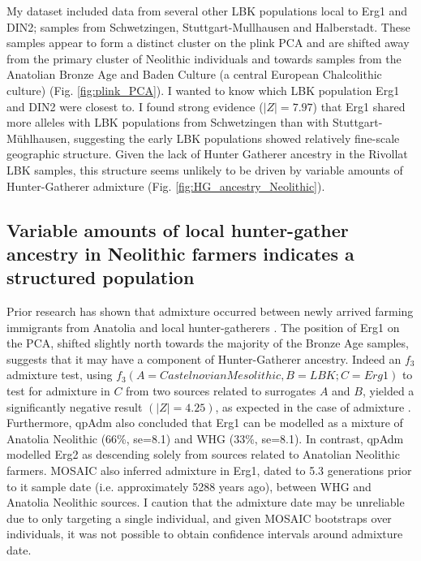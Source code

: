 My dataset included data from several other LBK populations local to Erg1 and DIN2; samples from Schwetzingen, Stuttgart-Mullhausen and Halberstadt. These samples appear to form a distinct cluster on the plink PCA and are shifted away from the primary cluster of Neolithic individuals and towards samples from the Anatolian Bronze Age and Baden Culture (a central European Chalcolithic culture) (Fig. \ref{fig:plink_PCA}). I wanted to know which LBK population Erg1 and DIN2 were closest to. I found strong evidence ($|Z| = 7.97$) that Erg1 shared more alleles with LBK populations from Schwetzingen than with Stuttgart-Mühlhausen, suggesting the early LBK populations showed relatively fine-scale geographic structure. Given the lack of Hunter Gatherer ancestry in the Rivollat LBK samples, this structure seems unlikely to be driven by variable amounts of Hunter-Gatherer admixture (Fig. \ref{fig:HG_ancestry_Neolithic}).


\subsection{Variable amounts of local hunter-gather ancestry in Neolithic farmers indicates a structured population}

Prior research has shown that admixture occurred between newly arrived farming immigrants from Anatolia and local hunter-gatherers \cite{Gamba2014, Haak2015, mathieson2018genomic, gonzalez2017paleogenomic, Lipson2017b}. The position of Erg1 on the PCA, shifted slightly north towards the majority of the Bronze Age samples, suggests that it may have a component of Hunter-Gatherer ancestry. Indeed an $f_{3}$ admixture test, using $f_{3}(A=Castelnovian Mesolithic, B=LBK; C=Erg1)$ to test for admixture in $C$ from two sources related to surrogates $A$ and $B$, yielded a significantly negative result $(|Z|=4.25)$, as expected in the case of admixture \cite{Patterson2012}. Furthermore, qpAdm also concluded that Erg1 can be modelled as a mixture of Anatolia Neolithic (66\%, se=8.1) and WHG (33\%, se=8.1). In contrast, qpAdm modelled Erg2 as descending solely from sources related to Anatolian Neolithic farmers. MOSAIC also inferred admixture in Erg1, dated to 5.3 generations prior to it sample date (i.e. approximately 5288 years ago), between WHG and Anatolia Neolithic sources. I caution that the admixture date may be unreliable due to only targeting a single individual, and given MOSAIC bootstraps over individuals, it was not possible to obtain confidence intervals around admixture date. 

